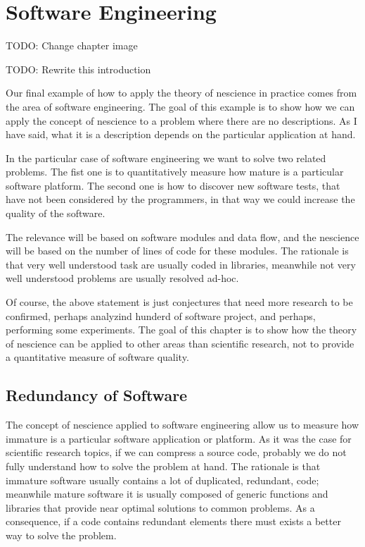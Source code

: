 %
%


\chapter{Software Engineering}
\label{chap:Software-Engineering}

{\color{red} TODO: Change chapter image}

{\color{red} TODO: Rewrite this introduction}

Our final example of how to apply the theory of nescience in practice comes from the area of software engineering. The goal of this example is to show how we can apply the concept of nescience to a problem where there are no descriptions. As I have said, what it is a description depends on the particular application at hand.

In the particular case of software engineering we want to solve two related problems. The fist one is to quantitatively measure how mature is a particular software platform. The second one is how to discover new software tests, that have not been considered by the programmers, in that way we could increase the quality of the software.

The relevance will be based on software modules and data flow, and the nescience will be based on the number of lines of code for these modules. The rationale is that very well understood task are usually coded in libraries, meanwhile not very well understood problems are usually resolved ad-hoc.

Of course, the above statement is just conjectures that need more research to be confirmed, perhaps analyzind hunderd of software project, and perhaps, performing some experiments. The goal of this chapter is to show how the theory of nescience can be applied to other areas than scientific research, not to provide a quantitative measure of software quality.

\section{Redundancy of Software}

The concept of nescience applied to software engineering allow us to measure how immature is a particular software application or platform. As it was the case for scientific research topics, if we can compress a source code, probably we do not fully understand how to solve the problem at hand. The rationale is that immature software usually contains a lot of duplicated, redundant, code; meanwhile mature software it is usually composed of generic functions and libraries that provide near optimal solutions to common problems. As a consequence, if a code contains redundant elements there must exists a better way to solve the problem.

